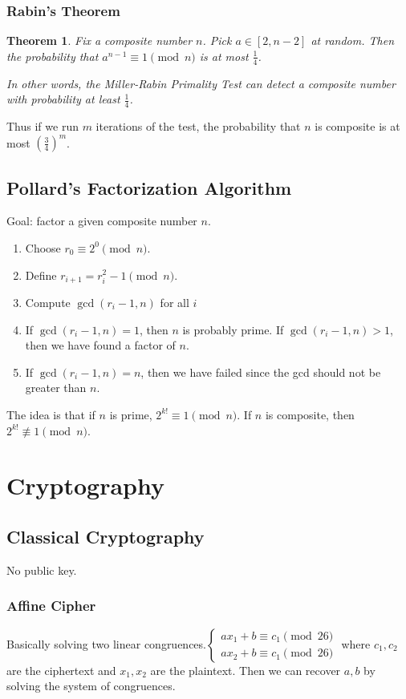 \documentclass[letterpaper,12pt,oneside]{article}
\newtheorem{theorem}{Theorem}
\begin{document}
\subsubsection{Rabin's Theorem}
\begin{theorem}
    Fix a composite number $n$. Pick $a\in [2,n-2]$ at random. Then the probability that $a^{n-1}\equiv 1\pmod n$ is at most $\frac{1}{4}$.

    In other words, the Miller-Rabin Primality Test can detect a composite number with probability at least $\frac{1}{4}$.
\end{theorem}
Thus if we run $m$ iterations of the test, the probability that $n$ is composite is at most $(\frac{3}{4})^m$.
\subsection{Pollard's Factorization Algorithm}
Goal: factor a given composite number $n$.\begin{enumerate}
    \item Choose $r_0 \equiv 2^0\pmod n$.
    \item Define $r_{i+1} = r_i^2-1\pmod n$.
    \item Compute $\gcd(r_i-1,n)$ for all $i$
    \item If $\gcd(r_i-1,n) = 1$, then $n$ is probably prime. If $\gcd(r_i-1,n) > 1$, then we have found a factor of $n$.
    \item If $\gcd(r_i-1,n) = n$, then we have failed since the gcd should not be greater than $n$.
\end{enumerate}
The idea is that if $n$ is prime, $2^{k!}\equiv 1\pmod n$. If $n$ is composite, then $2^{k!}\not\equiv 1\pmod n$.
\section{Cryptography}
\subsection{Classical Cryptography}
No public key. 
\subsubsection{Affine Cipher}
Basically solving two linear congruences.$\begin{cases}
    ax_1+b\equiv c_1\pmod{26}\\
    ax_2+b\equiv c_1\pmod{26}
\end{cases}$ where $c_1,c_2$ are the ciphertext and $x_1,x_2$ are the plaintext. Then we can recover $a,b$ by solving the system of congruences.
\end{document}
